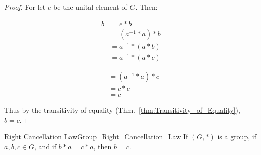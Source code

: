     \begin{proof}
        For let $e$ be the unital element of $G$. Then:
        \par\vspace{-2.5ex}
        \begin{minipage}[t]{0.49\textwidth}
            \centering
            \begin{align}
                b&=e*b
                \tag{Identity}\\
                &=(a^{\minus{1}}*a)*b
                \tag{Inverse}\\
                &=a^{\minus{1}}*(a*b)
                \tag{Associativity}\\
                &=a^{\minus{1}}*(a*c)
                \tag{Hypothesis}
            \end{align}
        \end{minipage}
        \hfill
        \begin{minipage}[t]{0.49\textwidth}
            \centering
            \begin{align}
                &=(a^{\minus{1}}*a)*c
                \tag{Associativity}\\
                &=c*e
                \tag{Inverse}\\
                &=c
                \tag{Identity}
            \end{align}
        \end{minipage}
        \par\vspace{2.5ex}
        Thus by the transitivity of equality
        (Thm.~\ref{thm:Transitivity_of_Equality}), $b=c$.
    \end{proof}
    \begin{ltheorem}{Right Cancellation Law}{Group_Right_Cancellation_Law}
        If $(G,*)$ is a group, if $a,b,c\in{G}$, and if $b*a=c*a$, then $b=c$.
    \end{ltheorem}
